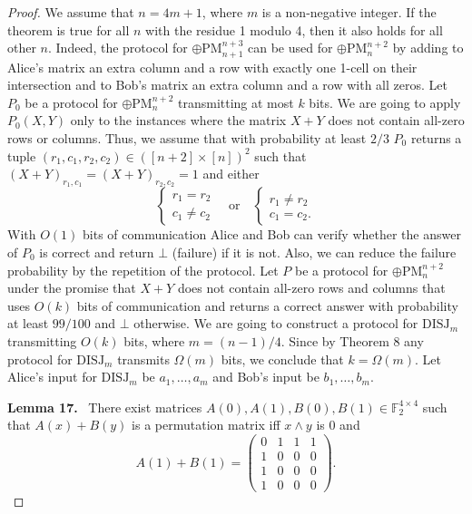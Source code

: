 \documentclass[10pt,a4paper]{article}
\newenvironment{authorclaim}[1]{\par\medskip\noindent\textbf{#1.}\ \ignorespaces}{\par\medskip}
\begin{document}
\begin{proof}
We assume that $n=4m+1$, where $m$ is a non-negative integer. If the theorem is true for all $n$ with the residue 1 modulo 4, then it also holds for all other $n$. Indeed, the protocol for $\oplus\mathrm{PM}_{n+1}^{n+3}$ can be used for $\oplus\mathrm{PM}_n^{n+2}$ by adding to Alice's matrix an extra column and a row with exactly one 1-cell on their intersection and to Bob's matrix an extra column and a row with all zeros.
Let $P_0$ be a protocol for $\oplus\mathrm{PM}_n^{n+2}$ transmitting at most $k$ bits. We are going to apply $P_0(X,Y)$ only to the instances where the matrix $X+Y$ does not contain all-zero rows or columns. Thus, we assume that with probability at least $2/3$ $P_0$ returns a tuple $(r_1,c_1,r_2,c_2)\in([n+2]\times[n])^2$ such that $(X+Y)_{r_1,c_1}=(X+Y)_{r_2,c_2}=1$ and either
\[
\begin{cases}r_1=r_2\\c_1\ne c_2\end{cases}
\quad\text{or}\quad
\begin{cases}r_1\ne r_2\\c_1=c_2.\end{cases}
\]
With $O(1)$ bits of communication Alice and Bob can verify whether the answer of $P_0$ is correct and return $\bot$ (failure) if it is not. Also, we can reduce the failure probability by the repetition of the protocol. Let $P$ be a protocol for $\oplus\mathrm{PM}_n^{n+2}$ under the promise that $X+Y$ does not contain all-zero rows and columns that uses $O(k)$ bits of communication and returns a correct answer with probability at least $99/100$ and $\bot$ otherwise.
We are going to construct a protocol for $\mathrm{DISJ}_m$ transmitting $O(k)$ bits, where $m=(n-1)/4$. Since by Theorem 8 any protocol for $\mathrm{DISJ}_m$ transmits $\Omega(m)$ bits, we conclude that $k=\Omega(m)$. Let Alice's input for $\mathrm{DISJ}_m$ be $a_1,\ldots,a_m$ and Bob's input be $b_1,\ldots,b_m$.
\begin{authorclaim}{Lemma 17}
There exist matrices $A(0),A(1),B(0),B(1)\in\mathbb F_2^{4\times4}$ such that $A(x)+B(y)$ is a permutation matrix iff $x\wedge y$ is 0 and
\begin{equation}
A(1)+B(1)=\begin{pmatrix}0&1&1&1\\1&0&0&0\\1&0&0&0\\1&0&0&0\end{pmatrix}.
\tag{1}
\end{equation}

\end{authorclaim}
\end{proof}
\end{document}
